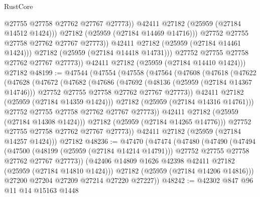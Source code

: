 \begin{lexlean}{RustCore}
\begin{coremodule}
                          @27755
                          @27758
                          @27762
                          @27767
                          @27773))
                      @42411
                      @27182
                      (@25959 (@27184 @14512 @1424)))
                    @27182
                    (@25959 (@27184 @14469 @14716)))
                  @27752
                  @27755
                  @27758
                  @27762
                  @27767
                  @27773))
              @42411
              @27182
              (@25959 (@27184 @14461 @1424)))
            @27182
            (@25959 (@27184 @14418 @14731)))
          @27752
          @27755
          @27758
          @27762
          @27767
          @27773))
      @42411
      @27182
      (@25959 (@27184 @14410 @1424)))
    @27182
@48199 := @47544
    (@47554
      (@47558
        (@47564
          (@47608
            (@47618
              (@47622
                (@47628
                  (@47672
                    (@47682
                      (@47686
                        (@47692
                          (@48136 (@25959 (@27184 @14367 @14746)))
                          @27752
                          @27755
                          @27758
                          @27762
                          @27767
                          @27773))
                      @42411
                      @27182
                      (@25959 (@27184 @14359 @1424)))
                    @27182
                    (@25959 (@27184 @14316 @14761)))
                  @27752
                  @27755
                  @27758
                  @27762
                  @27767
                  @27773))
              @42411
              @27182
              (@25959 (@27184 @14308 @1424)))
            @27182
            (@25959 (@27184 @14265 @14776)))
          @27752
          @27755
          @27758
          @27762
          @27767
          @27773))
      @42411
      @27182
      (@25959 (@27184 @14257 @1424)))
    @27182
@48236 := @47470
    (@47474
      (@47480
        (@47490
          (@47494
            (@47500
              (@48199 (@25959 (@27184 @14214 @14791)))
              @27752
              @27755
              @27758
              @27762
              @27767
              @27773))
          (@42406 @14809 @1626 @42398 @42411 @27182 (@25959 (@27184 @14810 @1424)))
          @27182
          (@25959 (@27184 @14206 @14816)))
        @27200
        @27204
        @27209
        @27214
        @27220
        @27227))
@48242 := @42302 @847 @96 @11 @14 @15163 @1448

\end{coremodule}
\end{lexlean}
